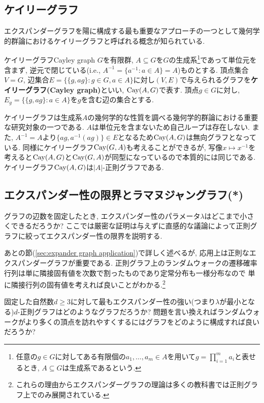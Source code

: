 \subsection{ケイリーグラフ}
エクスパンダーグラフを陽に構成する最も重要なアプローチの一つとして幾何学的群論におけるケイリーグラフと呼ばれる概念が知られている.
%
\begin{definition}{ケイリーグラフ}{Cayley graph}
    $G$を有限群, $A\subseteq G$を$G$の生成系\footnote{任意の$g\in G$に対してある有限個の$a_1,\dots,a_m\in A$を用いて$g=\prod_{i=1}^ma_i$と表せるとき, $A\subseteq G$は生成系であるという.}であって単位元を含まず, 逆元で閉じている(i.e., $A^{-1}=\{a^{-1}\colon a\in A\}=A$)ものとする.
    頂点集合$V=G$, 辺集合$E=\{\{g,ag\}\colon g\in G,a\in A\}$に対し$(V,E)$で与えられるグラフを\textbf{ケイリーグラフ(Cayley graph)}といい, $\mathrm{Cay}(A,G)$で表す.
    頂点$g\in G$に対し, $E_g=\{\{g,ag\}\colon a\in A\}$を$g$を含む辺の集合とする.
\end{definition}
%
ケイリーグラフは生成系$A$の幾何学的な性質を調べる幾何学的群論における重要な研究対象の一つである.
$A$は単位元を含まないため自己ループは存在しない.
また, $A^{-1}=A$より$\{ag,a^{-1}(ag)\}\in E$となるため$\mathrm{Cay}(A,G)$は無向グラフとなっている.
同様にケイリーグラフ$\mathrm{Cay}(G,A)$も考えることができるが, 写像$x\mapsto x^{-1}$を考えると$\mathrm{Cay}(A,G)$と$\mathrm{Cay}(G,A)$が同型になっているので本質的には同じである.
ケイリーグラフ$\mathrm{Cay}(A,G)$は$|A|$-正則グラフである.


\subsection{エクスパンダー性の限界とラマヌジャングラフ(*)}
グラフの辺数を固定したとき, エクスパンダー性のパラメータ$\lambda$はどこまで小さくできるだろうか?
ここでは厳密な証明は与えずに直感的な議論によって正則グラフに絞ってエクスパンダー性の限界を説明する.

あとの節(\cref{sec:expander graph application})で詳しく述べるが,
応用上は正則なエクスパンダーグラフが重要である.
正則グラフ上のランダムウォークの遷移確率行列は単に隣接固有値を次数で割ったものであり定常分布も一様分布なので
単に隣接行列の固有値を考えれば良いことがわかる.\footnote{これらの理由からエクスパンダーグラフの理論は多くの教科書では正則グラフ上でのみ展開されている.}

固定した自然数$d\ge 3$に対して最もエクスパンダー性の強い(つまり$\lambda$が最小となる)$d$-正則グラフはどのようなグラフだろうか?
問題を言い換えればランダムウォークがより多くの頂点を訪れやすくするにはグラフをどのように構成すれば良いだろうか?

